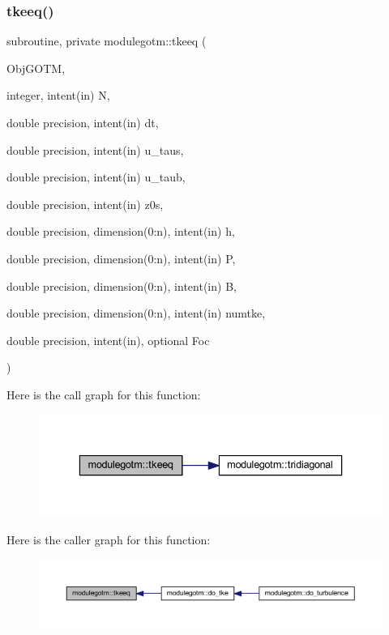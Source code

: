 \subsubsection{\texorpdfstring{tkeeq()}{tkeeq()}}
{\footnotesize\ttfamily subroutine, private modulegotm\+::tkeeq (\begin{DoxyParamCaption}\item[{}]{Obj\+G\+O\+TM,  }\item[{integer, intent(in)}]{N,  }\item[{double precision, intent(in)}]{dt,  }\item[{double precision, intent(in)}]{u\+\_\+taus,  }\item[{double precision, intent(in)}]{u\+\_\+taub,  }\item[{double precision, intent(in)}]{z0s,  }\item[{double precision, dimension(0\+:n), intent(in)}]{h,  }\item[{double precision, dimension(0\+:n), intent(in)}]{P,  }\item[{double precision, dimension(0\+:n), intent(in)}]{B,  }\item[{double precision, dimension(0\+:n), intent(in)}]{numtke,  }\item[{double precision, intent(in), optional}]{Foc }\end{DoxyParamCaption})\hspace{0.3cm}{\ttfamily [private]}}

Here is the call graph for this function\+:\nopagebreak
\begin{figure}[H]
\begin{center}
\leavevmode
\includegraphics[width=336pt]{namespacemodulegotm_aa2677c2275ef6e84a615765d4db0772c_cgraph}
\end{center}
\end{figure}
Here is the caller graph for this function\+:\nopagebreak
\begin{figure}[H]
\begin{center}
\leavevmode
\includegraphics[width=350pt]{namespacemodulegotm_aa2677c2275ef6e84a615765d4db0772c_icgraph}
\end{center}
\end{figure}
\mbox{\label{namespacemodulegotm_a95c763a61ad96de7516848ea4a686fdb}} 
